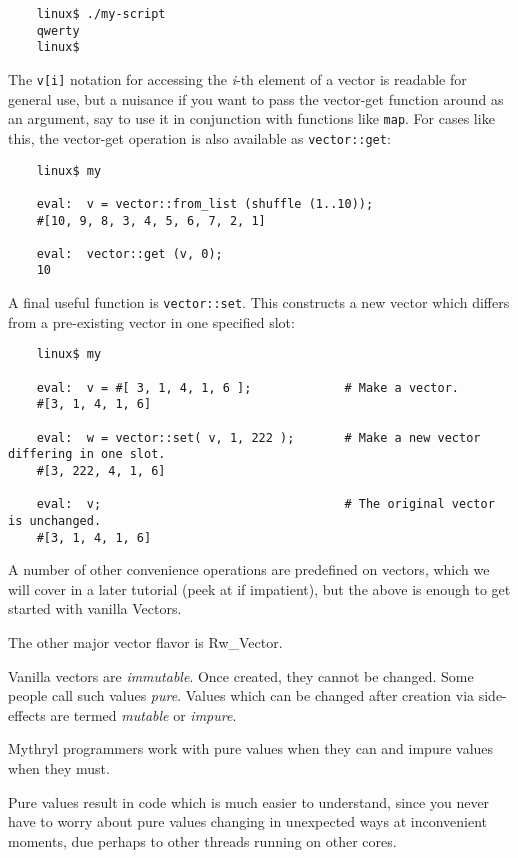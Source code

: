 \begin{verbatim}
    linux$ ./my-script
    qwerty
    linux$
\end{verbatim}


The {\tt v[i]} notation for accessing the {\it i}-th element of a vector 
is readable for general use, but a nuisance if you want to pass the 
vector-get function around as an argument, say to use it in conjunction with 
functions like {\tt map}.  For cases like this, the vector-get operation 
is also available as {\tt vector::get}:

\begin{verbatim}
    linux$ my

    eval:  v = vector::from_list (shuffle (1..10));
    #[10, 9, 8, 3, 4, 5, 6, 7, 2, 1]

    eval:  vector::get (v, 0);
    10
\end{verbatim}

A final useful function is {\tt vector::set}.  This constructs a new 
vector which differs from a pre-existing vector in one specified slot:

\begin{verbatim}
    linux$ my

    eval:  v = #[ 3, 1, 4, 1, 6 ];             # Make a vector.
    #[3, 1, 4, 1, 6]

    eval:  w = vector::set( v, 1, 222 );       # Make a new vector differing in one slot.
    #[3, 222, 4, 1, 6]

    eval:  v;                                  # The original vector is unchanged.
    #[3, 1, 4, 1, 6]
\end{verbatim}


A number of other convenience operations are predefined on vectors, 
which we will cover in a later tutorial (peek at  
if impatient), but 
the above is enough to get started with vanilla Vectors.

The other major vector flavor is Rw\_Vector.

Vanilla vectors are {\it immutable}.  Once created, they cannot be changed. 
Some people call such values {\it pure}.  Values which can be changed after 
creation via side-effects are termed {\it mutable} or {\it impure}.

Mythryl programmers work with pure values when they can and impure values 
when they must.

Pure values result in code which is much easier to understand, since 
you never have to worry about pure values changing in unexpected ways 
at inconvenient moments, due perhaps to other threads running on other 
cores.

